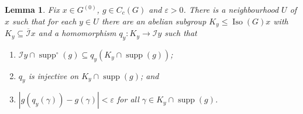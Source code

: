 \documentclass[a4paper, 12pt]{amsart}
\theoremstyle{plain}
\newtheorem{lemma}[theorem]{Lemma}
\theoremstyle{definition}
\theoremstyle{remark}
\newcommand{\Iso}{\operatorname{Iso}}
\newcommand{\supp}{\operatorname{supp}}
\newcommand{\Ii}{\mathcal{I}}
\newcommand{\Iicl}{\overline{\mathcal{I}}}
\numberwithin{equation}{section}
\begin{document}
\begin{lemma}\label{lem:editing g}
Fix $x \in
G^{(0)}$, $g \in C_c(G)$ and $\varepsilon > 0$. There is a neighbourhood $U$ of
$x$ such that for each $y \in U$ there are an abelian subgroup $K_y \le
\Iso(G)x$ with $K_y \subseteq \Iicl x$ and a homomorphism $q_y \colon K_y \to \Ii y$
such that
\begin{enumerate}[label=\textup{(\alph*)}]
\item\label{it:lem editing g:subset} $\Ii y \cap \supp^\circ (g) \subseteq
    q_y(K_y \cap \supp(g))$;
\item\label{it:lem editing g:injective} $q_y$ is injective on $K_y \cap \supp(g)$; and
\item\label{it:lem editing g:epsilon} $|g(q_y(\gamma)) - g(\gamma)| < \varepsilon$ for all $\gamma \in K_y
    \cap \supp(g)$.
\end{enumerate}
\end{lemma}
\end{document}
